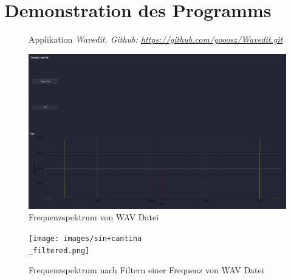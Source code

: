 \section{Demonstration des Programms}
\begin{frame}{\insertsection}
	\begin{figure}
		\caption*{Applikation \it{Wavedit}, Github: \href{https://github.com/gooosz/Wavedit.git}{https://github.com/gooosz/Wavedit.git}}
	\end{figure}
\end{frame}

\begin{frame}{\insertsection}
	\begin{figure}
		\includegraphics[width=\linewidth]{images/sin+cantina.png}
		\caption*{Frequenzspektrum von WAV Datei}
	\end{figure}
\end{frame}
\begin{frame}{\insertsection}
	\begin{figure}
		\texttt{[image: images/sin+cantina\\\_filtered.png]}
		\caption*{Frequenzspektrum nach Filtern einer Frequenz von WAV Datei}
	\end{figure}
\end{frame}
